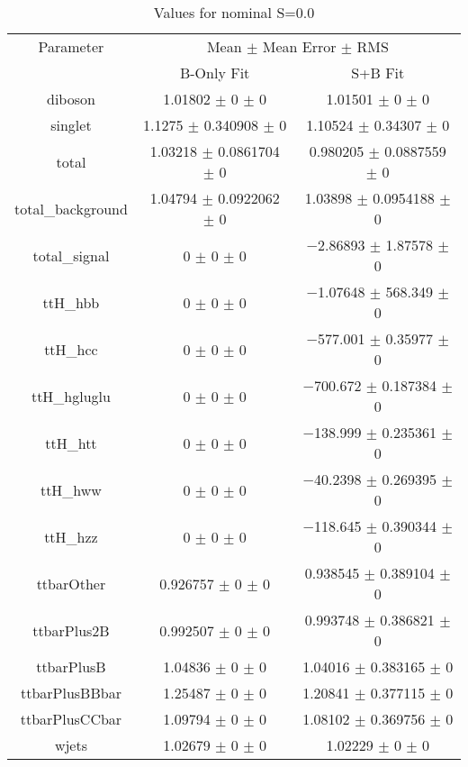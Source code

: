 \begin{table}
\centering
\caption{Values for nominal S=0.0}
\begin{tabular}{ccc}
\toprule
Parameter & \multicolumn{2}{c}{Mean $\pm$ Mean Error $\pm$ RMS}\\
 & B-Only Fit & S+B Fit\\
\midrule
diboson & \num{1.01802} $\pm$ \num{0} $\pm$ \num{0} & \num{1.01501} $\pm$ \num{0} $\pm$ \num{0}\\
singlet & \num{1.1275} $\pm$ \num{0.340908} $\pm$ \num{0} & \num{1.10524} $\pm$ \num{0.34307} $\pm$ \num{0}\\
total & \num{1.03218} $\pm$ \num{0.0861704} $\pm$ \num{0} & \num{0.980205} $\pm$ \num{0.0887559} $\pm$ \num{0}\\
total\_background & \num{1.04794} $\pm$ \num{0.0922062} $\pm$ \num{0} & \num{1.03898} $\pm$ \num{0.0954188} $\pm$ \num{0}\\
total\_signal & \num{0} $\pm$ \num{0} $\pm$ \num{0} & \num{-2.86893} $\pm$ \num{1.87578} $\pm$ \num{0}\\
ttH\_hbb & \num{0} $\pm$ \num{0} $\pm$ \num{0} & \num{-1.07648} $\pm$ \num{568.349} $\pm$ \num{0}\\
ttH\_hcc & \num{0} $\pm$ \num{0} $\pm$ \num{0} & \num{-577.001} $\pm$ \num{0.35977} $\pm$ \num{0}\\
ttH\_hgluglu & \num{0} $\pm$ \num{0} $\pm$ \num{0} & \num{-700.672} $\pm$ \num{0.187384} $\pm$ \num{0}\\
ttH\_htt & \num{0} $\pm$ \num{0} $\pm$ \num{0} & \num{-138.999} $\pm$ \num{0.235361} $\pm$ \num{0}\\
ttH\_hww & \num{0} $\pm$ \num{0} $\pm$ \num{0} & \num{-40.2398} $\pm$ \num{0.269395} $\pm$ \num{0}\\
ttH\_hzz & \num{0} $\pm$ \num{0} $\pm$ \num{0} & \num{-118.645} $\pm$ \num{0.390344} $\pm$ \num{0}\\
ttbarOther & \num{0.926757} $\pm$ \num{0} $\pm$ \num{0} & \num{0.938545} $\pm$ \num{0.389104} $\pm$ \num{0}\\
ttbarPlus2B & \num{0.992507} $\pm$ \num{0} $\pm$ \num{0} & \num{0.993748} $\pm$ \num{0.386821} $\pm$ \num{0}\\
ttbarPlusB & \num{1.04836} $\pm$ \num{0} $\pm$ \num{0} & \num{1.04016} $\pm$ \num{0.383165} $\pm$ \num{0}\\
ttbarPlusBBbar & \num{1.25487} $\pm$ \num{0} $\pm$ \num{0} & \num{1.20841} $\pm$ \num{0.377115} $\pm$ \num{0}\\
ttbarPlusCCbar & \num{1.09794} $\pm$ \num{0} $\pm$ \num{0} & \num{1.08102} $\pm$ \num{0.369756} $\pm$ \num{0}\\
wjets & \num{1.02679} $\pm$ \num{0} $\pm$ \num{0} & \num{1.02229} $\pm$ \num{0} $\pm$ \num{0}\\
\bottomrule
\end{tabular}
\end{table}